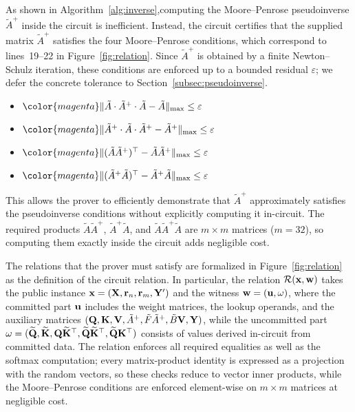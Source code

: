 \documentclass[sigconf,anonymous,review,balance=false]{acmart}
\newcommand{\rev}[1]{{\color{magenta}#1}}
\begin{document}
As shown in Algorithm~\ref{alg:inverse},computing the Moore--Penrose pseudoinverse $\tilde{A}^{+}$ inside the circuit is inefficient.
Instead, the circuit certifies that the supplied matrix $\tilde{A}^{+}$ satisfies the four Moore--Penrose conditions, which correspond to lines~19--22 in Figure~\ref{fig:relation}.
Since $\tilde{A}^{+}$ is obtained by a finite Newton--Schulz iteration, these conditions are enforced up to a bounded residual $\varepsilon$; we defer the concrete tolerance to Section~\ref{subsec:pseudoinverse}.
\begin{itemize}
    \item $\rev{\lVert\tilde{A}\cdot\tilde{A}^{+}\cdot\tilde{A}-\tilde{A}\rVert_{\max} \leq \varepsilon}$
    \item $\rev{\lVert\tilde{A}^{+}\cdot\tilde{A}\cdot\tilde{A}^{+}-\tilde{A}^{+}\rVert_{\max} \leq \varepsilon}$
    \item $\rev{\lVert(\tilde{A}\tilde{A}^{+})^{\top}-\tilde{A}\tilde{A}^{+}\rVert_{\max} \leq \varepsilon}$
    \item $\rev{\lVert(\tilde{A}^{+}\tilde{A})^{\top}-\tilde{A}^{+}\tilde{A}\rVert_{\max} \leq \varepsilon}$
\end{itemize}
This allows the prover to efficiently demonstrate that $\tilde{A}^{+}$ approximately satisfies the pseudoinverse conditions without explicitly computing it in-circuit.
\rev{The required products $\widetilde{A}\widetilde{A}^{+}$, $\widetilde{A}^{+}\widetilde{A}$, and $\widetilde{A}\widetilde{A}^{+}\widetilde{A}$ are $m\times m$ matrices ($m{=}32$), so computing them exactly inside the circuit adds negligible cost.}

The relations that the prover must satisfy are formalized in Figure~\ref{fig:relation} as the definition of the circuit relation. In particular, the relation ${\mathcal{R}}({\mathbf{x}},{\mathbf{w}})$ takes the public instance ${\mathbf{x}}=({\mathbf{X}},{\mathbf{r}}_n,{\mathbf{r}}_m, {\mathbf{Y}}')$ and the witness ${\mathbf{w}}=({\mathbf{u}}, {\mathbf{\omega}})$, where \rev{the committed part ${\mathbf{u}}$ includes the weight matrices, the lookup operands, and the auxiliary matrices $({\mathbf{Q}},{\mathbf{K}},{\mathbf{V}},\tilde{A}^{+},\tilde{F}\tilde{A}^{+},\tilde{B}{\mathbf{V}},{\mathbf{Y}})$, while the uncommitted part ${\mathbf{\omega}} = (\widetilde{{\mathbf{Q}}}, \widetilde{{\mathbf{K}}}, {\mathbf{Q}}\widetilde{{\mathbf{K}}}^{\top}, \widetilde{{\mathbf{Q}}}\widetilde{{\mathbf{K}}}^{\top}, \widetilde{{\mathbf{Q}}}{\mathbf{K}}^{\top})$ consists of values derived in-circuit from committed data}. \rev{The relation enforces all required equalities as well as the softmax computation; every matrix-product identity is expressed as a projection with the random vectors, so these checks reduce to vector inner products, while the Moore--Penrose conditions are enforced element-wise on $m \times m$ matrices at negligible cost.}
\end{document}
